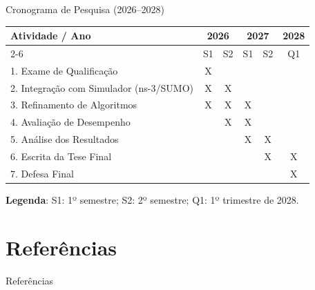 \documentclass{beamer}
\begin{document}
\begin{frame}{Cronograma de Pesquisa (2026--2028)}
    \centering
    \scriptsize
    \renewcommand{\arraystretch}{1.2}
    \begin{tabular}{|l|c|c|c|c|c|} 
        \hline
        \textbf{Atividade / Ano} & \multicolumn{2}{c|}{\textbf{2026}} & \multicolumn{2}{c|}{\textbf{2027}} & \textbf{2028} \\ \cline{2-6}
        & S1 & S2 & S1 & S2 & Q1 \\ \hline
        1. Exame de Qualificação            & \cellcolor{blue!15}X &   &   &   &   \\ \hline
        2. Integração com Simulador (ns-3/SUMO) & \cellcolor{blue!15}X & \cellcolor{blue!15}X &   &   &   \\ \hline
        3. Refinamento de Algoritmos        & \cellcolor{blue!15}X & \cellcolor{blue!15}X & \cellcolor{blue!15}X &   &   \\ \hline
        4. Avaliação de Desempenho          &   & \cellcolor{blue!15}X & \cellcolor{blue!15}X &   &   \\ \hline
        5. Análise dos Resultados           &   &   & \cellcolor{blue!15}X & \cellcolor{blue!15}X &   \\ \hline
        6. Escrita da Tese Final            &   &   &   & \cellcolor{blue!15}X & \cellcolor{blue!15}X \\ \hline
        7. Defesa Final                     &   &   &   &   & \cellcolor{blue!15}X \\ \hline
    \end{tabular} 
    
    \vspace{0.4cm}
    \tiny \textbf{Legenda}: S1: 1º semestre; S2: 2º semestre; Q1: 1º trimestre de 2028.
\end{frame}

\section{Referências}
\begin{frame}[allowframebreaks]{Referências}


\end{frame}


\begin{frame}
    \maketitle
\end{frame}
\end{document}
